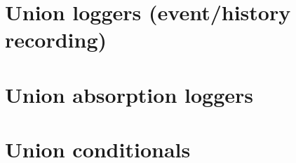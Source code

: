 













\section{Union loggers (event/history recording)}








\section{Union absorption loggers}










\section{Union conditionals}


